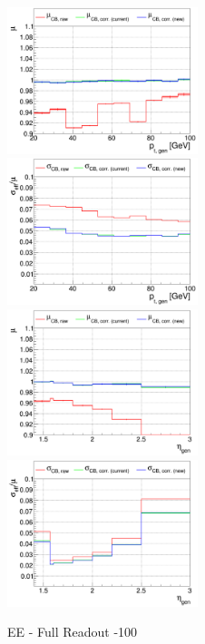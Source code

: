 \begin{figure}
\includegraphics[width=0.495\textwidth]{./plots_pdf/ECAL_plots/plotsPU/EE/FULL/pdf/GENPT/EEFULL_GENPT_0020_0100_MuOverBins.pdf}
\includegraphics[width=0.495\textwidth]{./plots_pdf/ECAL_plots/plotsPU/EE/FULL/pdf/GENPT/EEFULL_GENPT_0020_0100_EffSigmaOverBins.pdf}
\includegraphics[width=0.495\textwidth]{./plots_pdf/ECAL_plots/plotsPU/EE/FULL/pdf/GENETA/EEFULL_GENETA_0020_0100_MuOverBins.pdf}
\includegraphics[width=0.495\textwidth]{./plots_pdf/ECAL_plots/plotsPU/EE/FULL/pdf/GENETA/EEFULL_GENETA_0020_0100_EffSigmaOverBins.pdf}
\caption{EE - Full Readout -100}
\end{figure}

